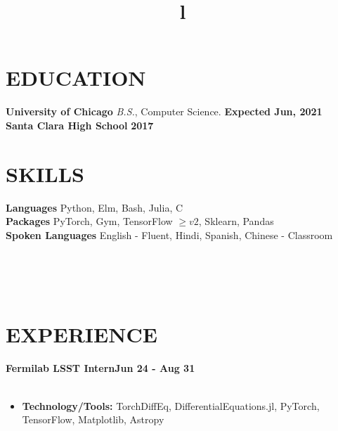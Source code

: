 \documentclass[margin]{res}
\begin{document}
\begin{resume}

\section{EDUCATION}
\textbf{University of Chicago}
{\sl B.S.}, Computer Science. \hfill \textbf{Expected Jun, 2021}\\
\textbf{Santa Clara High School} \hfill \textbf{2017}
\section{SKILLS}
\textbf{Languages} Python, Elm, Bash, Julia, C\\
\textbf{Packages}  PyTorch, Gym, TensorFlow $\geq v2$, Sklearn, Pandas \\
\textbf{Spoken Languages} English - Fluent, Hindi, Spanish, Chinese - Classroom

\begin{format}
\title{l}\\
\\
\body\\
\end{format}
\section{EXPERIENCE}
\textbf{Fermilab LSST Intern\hfill Jun 24 - Aug 31}\\
\\
\begin{itemize}
    \item \textbf{Technology/Tools:} TorchDiffEq, DifferentialEquations.jl, PyTorch, TensorFlow, Matplotlib, Astropy
\end{itemize}

\end{resume}
\end{document}
